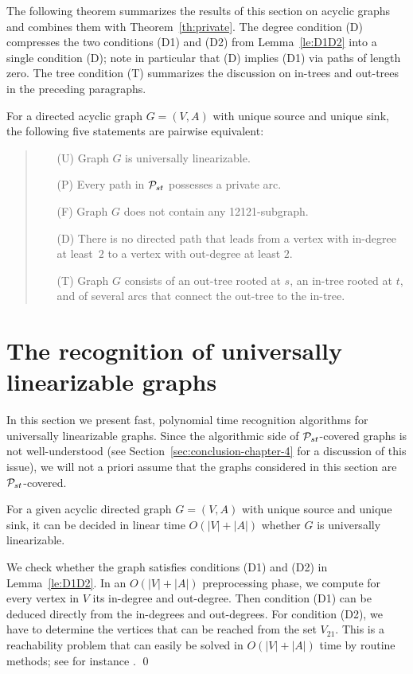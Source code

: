 \bigskip
The following theorem summarizes the results of this section on acyclic graphs and 
combines them with Theorem~\ref{th:private}.
The degree condition (D) compresses the two conditions (D1) and (D2) from Lemma~\ref{le:D1D2} into 
a single condition (D); note in particular that (D) implies (D1) via paths of length zero.
The tree condition (T) summarizes the discussion on in-trees and out-trees in the preceding paragraphs.
\begin{theorem}
\label{th:acyclic}
For a directed acyclic graph $G=(V,A)$ with unique source and unique sink, 
the following five statements are pairwise equivalent:
\begin{quote}
\begin{itemize}
\itemsep=0.9ex
\item[(U)] Graph $G$ is universally linearizable.
\item[(P)] Every path in ${\cal P}_{st}$ possesses a private arc.
\item[(F)] Graph $G$ does not contain any 12121-subgraph.
\item[(D)] There is no directed path that leads from a vertex with in-degree 
at least~$2$ to a vertex with out-degree at least $2$.
\item[(T)] Graph $G$ consists of an out-tree rooted at $s$, an in-tree rooted at $t$,
and of several arcs that connect the out-tree to the in-tree.
\end{itemize}
\end{quote}
\end{theorem}


\medskip
\section{The recognition of universally linearizable graphs}
\label{sec:algo}
In this section we present fast, polynomial time recognition algorithms for
universally linearizable graphs.
Since the algorithmic side of ${\cal P}_{st}$-covered graphs is not well-understood 
(see Section~\ref{sec:conclusion-chapter-4} for a discussion of this issue), we will not a priori 
assume that the graphs considered in this section are ${\cal P}_{st}$-covered.

\begin{lemma}
\label{le:algo-acyclic}
For a given acyclic directed graph $G=(V,A)$ with unique source and unique sink, 
it can be decided in linear time $O(|V|+|A|)$ whether $G$ is universally linearizable.
\end{lemma}
\proof
We check whether the graph satisfies conditions (D1) and (D2) in Lemma~\ref{le:D1D2}.
In an $O(|V|+|A|)$ preprocessing phase, we compute for every vertex in $V$ its in-degree and out-degree.
Then condition (D1) can be deduced directly from the in-degrees and out-degrees.
For condition (D2), we have to determine the vertices that can be reached from the set $V_{21}$.
This is a reachability problem that can easily be solved in $O(|V|+|A|)$ time by routine methods; 
see for instance \cite{CLRS}.
\qed

